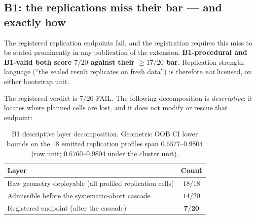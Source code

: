 \documentclass[11pt]{article}
\begin{document}
\subsection{B1: the replications miss their bar --- and exactly how}

The registered replication endpoints fail, and the registration requires this miss to be stated
prominently in any publication of the extension. \textbf{B1-procedural and B1-valid both score
$7/20$ against their $\geq 17/20$ bar.} Replication-strength language (``the sealed result
replicates on fresh data'') is therefore \emph{not} licensed, on either bootstrap unit.

The registered verdict is $7/20$ FAIL. The following decomposition is \emph{descriptive}: it
locates where planned cells are lost, and it does not modify or rescue that endpoint:

\begin{table}[tbp]
\centering\small
\begin{tabular}{@{}lc@{}}
\toprule
Layer & Count \\
\midrule
Raw geometry deployable (all profiled replication cells) & $18/18$ \\
Admissible before the systematic-abort cascade & $14/20$ \\
Registered endpoint (after the cascade) & $\mathbf{7/20}$ \\
\bottomrule
\end{tabular}
\caption{B1 descriptive layer decomposition. Geometric OOB CI lower bounds on the $18$ emitted
replication profiles span $0.6577$--$0.9804$ (row unit; $0.6760$--$0.9804$ under the cluster
unit).}
\label{tab:b1}
\end{table}
\end{document}
